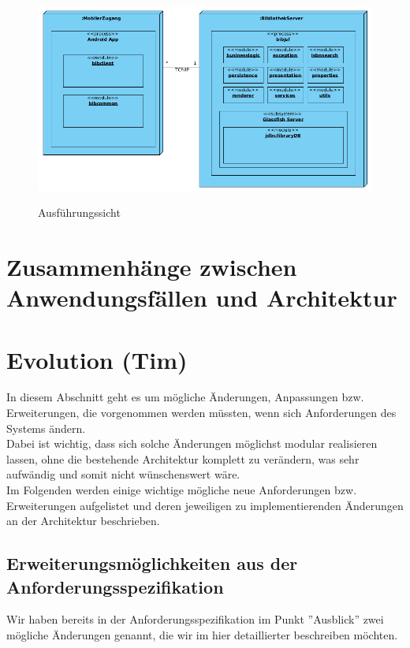 \documentclass[fontsize=12pt,paper=a4,twoside]{scrartcl}
\begin{document}
\begin{figure} [H] 
\caption{Ausführungssicht} 
	\includegraphics[width=1\textwidth]{Diagramme/ausfuehrungssicht.png} 
	\label{ausfuehrungssicht} 
\end{figure}
\label{sec:ausfuehrung}

\section{Zusammenhänge zwischen Anwendungsfällen und Architektur}
\label{sec:anwendungsfaelle}



\section{Evolution (Tim)}


\label{sec:evolution}

In diesem Abschnitt geht es um mögliche Änderungen, Anpassungen bzw. Erweiterungen, die vorgenommen werden müssten, wenn sich Anforderungen des Systems ändern. \\
Dabei ist wichtig, dass sich solche Änderungen möglichst modular realisieren lassen, ohne die bestehende Architektur komplett zu verändern, was sehr aufwändig und somit nicht wünschenswert wäre. \\
Im Folgenden werden einige wichtige mögliche neue Anforderungen bzw. Erweiterungen aufgelistet und deren jeweiligen zu implementierenden Änderungen an der Architektur beschrieben. 

\subsection*{Erweiterungsmöglichkeiten aus der Anforderungsspezifikation}

Wir haben bereits in der Anforderungsspezifikation im Punkt ''Ausblick'' zwei mögliche Änderungen genannt, die wir im hier detaillierter beschreiben möchten. 
\end{document}
